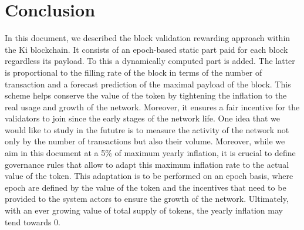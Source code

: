 \documentclass[conference]{IEEEtran}
\begin{document}
\section{Conclusion}
In this document, we described the block validation rewarding approach within the Ki blockchain. It consists of an epoch-based static part paid for each block regardless its payload. To this a dynamically computed part is added. The latter is proportional to the filling rate of the block in terms of the number of transaction and a forecast prediction of the maximal payload of the block. This scheme helps conserve the value of the token by tightening the inflation to the real usage and growth of the network. Moreover, it ensures a fair incentive for the validators to join since the early stages of the network life. One idea that we would like to study in the fututre is to measure the activity of the network not only by the number of transactions but also their volume. Moreover, while we aim in this document at a 5\% of maximum yearly inflation, it is crucial to define governance rules that allow to adapt this maximum inflation rate to the actual value of the token. This adaptation is to be performed on an epoch basis, where epoch are defined by the value of the token and the incentives that need to be provided to the system actors to ensure the growth of the network. Ultimately, with an ever growing value of total supply of tokens, the yearly inflation may tend towards 0.

\label{sec:conclusion}
\end{document}
